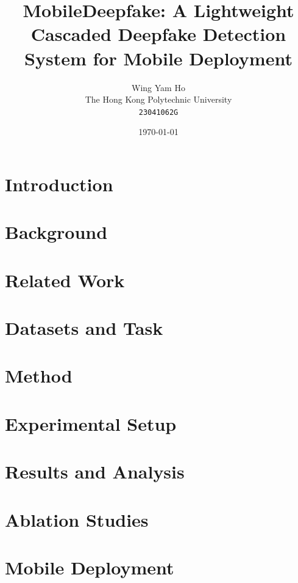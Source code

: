 \documentclass[11pt]{article}
\title{MobileDeepfake: A Lightweight Cascaded Deepfake Detection System for Mobile Deployment}
\author{Wing Yam Ho \\ The Hong Kong Polytechnic University \\ \texttt{23041062G}}
\date{\today}
\begin{document}
\maketitle

\begin{abstract}

\end{abstract}

\section{Introduction}


\section{Background}


\section{Related Work}


\section{Datasets and Task}


\section{Method}


\section{Experimental Setup}


\section{Results and Analysis}


\section{Ablation Studies}


\section{Mobile Deployment}

\end{document}
